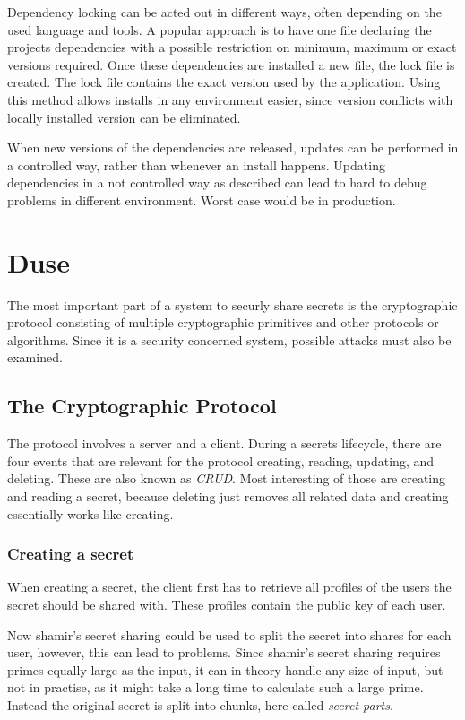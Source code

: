 Dependency locking can be acted out in different ways, often depending on the
used language and tools. A popular approach is to have one file declaring the
projects dependencies with a possible restriction on minimum, maximum or exact
versions required. Once these dependencies are installed a new file, the lock
file is created. The lock file contains the exact version used by the
application. Using this method allows installs in any environment easier, since
version conflicts with locally installed version can be eliminated.

When new versions of the dependencies are released, updates can be performed in
a controlled way, rather than whenever an install happens. Updating
dependencies in a not controlled way as described can lead to hard to debug
problems in different environment. Worst case would be in production.

\chapter{Duse}

The most important part of a system to securly share secrets is the
cryptographic protocol consisting of multiple cryptographic primitives and
other protocols or algorithms. Since it is a security concerned system,
possible attacks must also be examined.

\section{The Cryptographic Protocol}

The protocol involves a server and a client. During a secrets lifecycle, there
are four events that are relevant for the protocol creating, reading, updating,
and deleting. These are also known as \textit{CRUD}. Most interesting of those
are creating and reading a secret, because deleting just removes all related
data and creating essentially works like creating.

\subsection{Creating a secret}

When creating a secret, the client first has to retrieve all profiles of the
users the secret should be shared with. These profiles contain the public key
of each user.

Now shamir's secret sharing could be used to split the secret into shares for
each user, however, this can lead to problems. Since shamir's secret sharing
requires primes equally large as the input, it can in theory handle any size of
input, but not in practise, as it might take a long time to calculate such a
large prime. Instead the original secret is split into chunks, here called
\textit{secret parts}.

